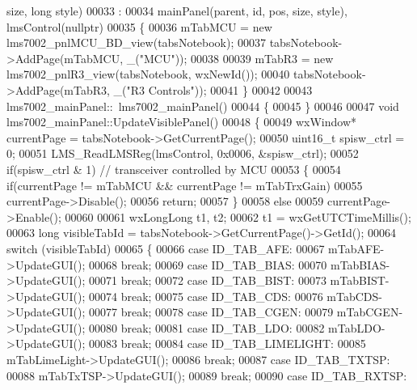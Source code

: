 \begin{DoxyCode}
      size, \textcolor{keywordtype}{long} style)
00033     :
00034     mainPanel(parent, id, pos, size, style), lmsControl(nullptr)
00035 \{
00036     mTabMCU = \textcolor{keyword}{new} lms7002_pnlMCU_BD_view(tabsNotebook);
00037     tabsNotebook->AddPage(mTabMCU, \_(\textcolor{stringliteral}{"MCU"}));
00038 
00039     mTabR3 = \textcolor{keyword}{new} lms7002_pnlR3_view(tabsNotebook, wxNewId());
00040     tabsNotebook->AddPage(mTabR3, \_(\textcolor{stringliteral}{"R3 Controls"}));
00041 \}
00042 
00043 lms7002_mainPanel::~lms7002_mainPanel()
00044 \{
00045 \}
00046 
00047 \textcolor{keywordtype}{void} lms7002_mainPanel::UpdateVisiblePanel()
00048 \{
00049     wxWindow* currentPage = tabsNotebook->GetCurrentPage();
00050     uint16\_t spisw\_ctrl = 0;
00051     LMS_ReadLMSReg(lmsControl, 0x0006, &spisw\_ctrl);
00052     \textcolor{keywordflow}{if}(spisw\_ctrl & 1) \textcolor{comment}{// transceiver controlled by MCU}
00053     \{
00054         \textcolor{keywordflow}{if}(currentPage != mTabMCU && currentPage != mTabTrxGain)
00055             currentPage->Disable();
00056         \textcolor{keywordflow}{return};
00057     \}
00058     \textcolor{keywordflow}{else}
00059         currentPage->Enable();
00060 
00061     wxLongLong t1, t2;
00062     t1 = wxGetUTCTimeMillis();
00063     \textcolor{keywordtype}{long} visibleTabId = tabsNotebook->GetCurrentPage()->GetId();
00064     \textcolor{keywordflow}{switch} (visibleTabId)
00065     \{
00066     \textcolor{keywordflow}{case} ID_TAB_AFE:
00067         mTabAFE->UpdateGUI();
00068         \textcolor{keywordflow}{break};
00069     \textcolor{keywordflow}{case} ID_TAB_BIAS:
00070         mTabBIAS->UpdateGUI();
00071         \textcolor{keywordflow}{break};
00072     \textcolor{keywordflow}{case} ID_TAB_BIST:
00073         mTabBIST->UpdateGUI();
00074         \textcolor{keywordflow}{break};
00075     \textcolor{keywordflow}{case} ID_TAB_CDS:
00076         mTabCDS->UpdateGUI();
00077         \textcolor{keywordflow}{break};
00078     \textcolor{keywordflow}{case} ID_TAB_CGEN:
00079         mTabCGEN->UpdateGUI();
00080         \textcolor{keywordflow}{break};
00081     \textcolor{keywordflow}{case} ID_TAB_LDO:
00082         mTabLDO->UpdateGUI();
00083         \textcolor{keywordflow}{break};
00084     \textcolor{keywordflow}{case} ID_TAB_LIMELIGHT:
00085         mTabLimeLight->UpdateGUI();
00086         \textcolor{keywordflow}{break};
00087     \textcolor{keywordflow}{case} ID_TAB_TXTSP:
00088         mTabTxTSP->UpdateGUI();
00089         \textcolor{keywordflow}{break};
00090     \textcolor{keywordflow}{case} ID_TAB_RXTSP:

\end{DoxyCode}

